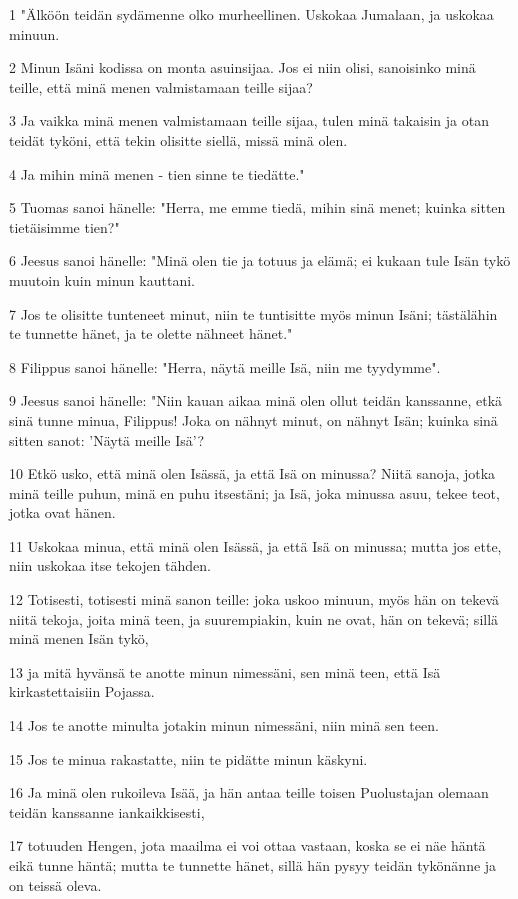\par 1 "Älköön teidän sydämenne olko murheellinen. Uskokaa Jumalaan, ja uskokaa minuun.
\par 2 Minun Isäni kodissa on monta asuinsijaa. Jos ei niin olisi, sanoisinko minä teille, että minä menen valmistamaan teille sijaa?
\par 3 Ja vaikka minä menen valmistamaan teille sijaa, tulen minä takaisin ja otan teidät tyköni, että tekin olisitte siellä, missä minä olen.
\par 4 Ja mihin minä menen - tien sinne te tiedätte."
\par 5 Tuomas sanoi hänelle: "Herra, me emme tiedä, mihin sinä menet; kuinka sitten tietäisimme tien?"
\par 6 Jeesus sanoi hänelle: "Minä olen tie ja totuus ja elämä; ei kukaan tule Isän tykö muutoin kuin minun kauttani.
\par 7 Jos te olisitte tunteneet minut, niin te tuntisitte myös minun Isäni; tästälähin te tunnette hänet, ja te olette nähneet hänet."
\par 8 Filippus sanoi hänelle: "Herra, näytä meille Isä, niin me tyydymme".
\par 9 Jeesus sanoi hänelle: "Niin kauan aikaa minä olen ollut teidän kanssanne, etkä sinä tunne minua, Filippus! Joka on nähnyt minut, on nähnyt Isän; kuinka sinä sitten sanot: 'Näytä meille Isä'?
\par 10 Etkö usko, että minä olen Isässä, ja että Isä on minussa? Niitä sanoja, jotka minä teille puhun, minä en puhu itsestäni; ja Isä, joka minussa asuu, tekee teot, jotka ovat hänen.
\par 11 Uskokaa minua, että minä olen Isässä, ja että Isä on minussa; mutta jos ette, niin uskokaa itse tekojen tähden.
\par 12 Totisesti, totisesti minä sanon teille: joka uskoo minuun, myös hän on tekevä niitä tekoja, joita minä teen, ja suurempiakin, kuin ne ovat, hän on tekevä; sillä minä menen Isän tykö,
\par 13 ja mitä hyvänsä te anotte minun nimessäni, sen minä teen, että Isä kirkastettaisiin Pojassa.
\par 14 Jos te anotte minulta jotakin minun nimessäni, niin minä sen teen.
\par 15 Jos te minua rakastatte, niin te pidätte minun käskyni.
\par 16 Ja minä olen rukoileva Isää, ja hän antaa teille toisen Puolustajan olemaan teidän kanssanne iankaikkisesti,
\par 17 totuuden Hengen, jota maailma ei voi ottaa vastaan, koska se ei näe häntä eikä tunne häntä; mutta te tunnette hänet, sillä hän pysyy teidän tykönänne ja on teissä oleva.
